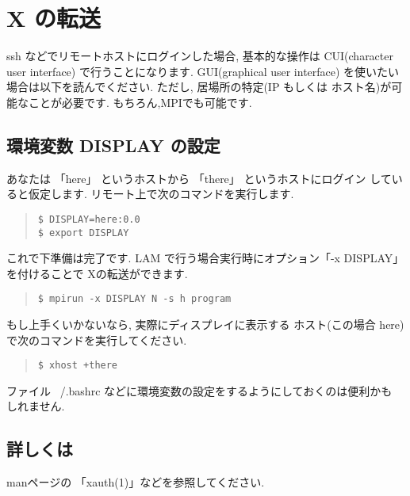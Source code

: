 \documentclass[a4paper,titlepage]{jreport}
\begin{document}
\newpage

\section{X の転送}
ssh などでリモートホストにログインした場合, 基本的な操作は
 CUI(character user interface) で行うことになります. 
GUI(graphical user interface) を使いたい場合は以下を読んでください.
ただし, 居場所の特定(IP もしくは ホスト名)が可能なことが必要です.
もちろん,MPIでも可能です.

\subsection{環境変数 DISPLAY の設定}
あなたは 「here」 というホストから 「there」 というホストにログイン
していると仮定します. リモート上で次のコマンドを実行します.

\begin{quote}
\begin{screen}
\begin{verbatim}
$ DISPLAY=here:0.0
$ export DISPLAY
\end{verbatim}
\end{screen}
\end{quote}

これで下準備は完了です. LAM で行う場合実行時にオプション「-x DISPLAY」
を付けることで Xの転送ができます.

\begin{quote}
\begin{screen}
\begin{verbatim}
$ mpirun -x DISPLAY N -s h program
\end{verbatim}
\end{screen}
\end{quote}

もし上手くいかないなら, 実際にディスプレイに表示する
ホスト(この場合 here)で次のコマンドを実行してください.

\begin{quote}
\begin{screen}
\begin{verbatim}
$ xhost +there
\end{verbatim}
\end{screen}
\end{quote}

ファイル ~/.bashrc などに環境変数の設定をするようにしておくのは便利かも
しれません.

\subsection{詳しくは}
manページの 「xauth(1)」などを参照してください.
\end{document}
